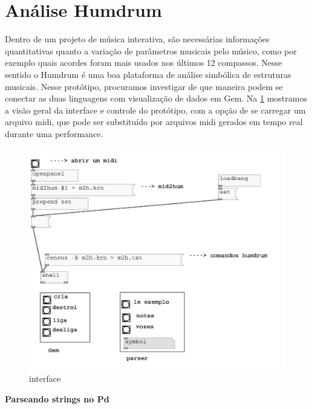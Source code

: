 \documentclass{ppgmus}
\begin{document}
\pagebreak 



\section{Análise Humdrum}

  Dentro de um projeto de música interativa, são necessárias informações quantitativas quanto a 
variação de parâmetros musicais pelo músico, como por exemplo quais acordes foram mais usados 
nos últimos 12 compassos.
Nesse sentido o Humdrum é uma boa plataforma de análise simbólica de estruturas musicais. 
Nesse protótipo, procuramos investigar de que maneira podem se conectar as duas linguagens 
com visualização de dados em Gem.
Na \ref{interface} mostramos a visão geral da interface e controle
do protótipo, com a opção de se carregar um arquivo midi, 
que pode ser substituído por arquivos midi gerados em tempo real 
durante uma performance.




\begin{figure}
\includegraphics[scale=.7]{interface00}
\caption{interface}
\label{interface}
\end{figure} 

\textbf{Parseando strings no Pd}
\end{document}
